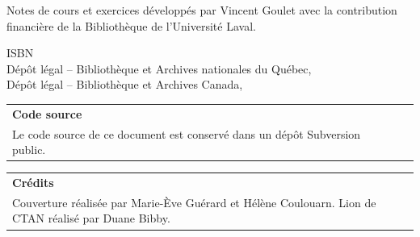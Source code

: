 \begin{frame}[t,plain]
  Notes de cours et exercices développés par Vincent Goulet avec la
  contribution financière de la Bibliothèque de l'Université Laval.
  \vfill

  ISBN {\ISBN} \\
  Dépôt légal -- Bibliothèque et Archives nationales du Québec, {\year} \\
  Dépôt légal -- Bibliothèque et Archives Canada, {\year}
  \vfill

  \begin{minipage}{0.55\textwidth}
    \begin{tabularx}{\linewidth}{@{}Xl@{}}
      \textbf{Code source} \\
      Le code source de ce document est conservé dans un dépôt
      Subversion public. &
                           \raisebox{-3pt}{%
                           \href{https://svn.fsg.ulaval.ca/svn-pub/vgoulet/formation_latex/}{%
                           \browsebutton}}
    \end{tabularx}
  \end{minipage}
  \hfill
  \begin{minipage}{0.4\textwidth}
    \begin{tabularx}{\linewidth}{@{}X@{}}
      \textbf{Crédits} \\
      Couverture réalisée par Marie-Ève Guérard et \newline Hélène
      Coulouarn. Lion de CTAN réalisé par Duane Bibby.
    \end{tabularx}
  \end{minipage}
  \vfill

\end{frame}

